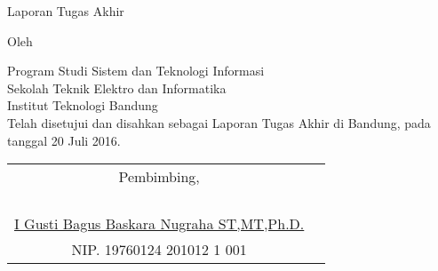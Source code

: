 \clearpage
\pagestyle{empty}

\begin{center}
\smallskip

    \Large \bfseries \MakeUppercase{\thetitle}
    \vfill

    \Large Laporan Tugas Akhir
    \vfill

    \large Oleh

    \Large \theauthor

    \large Program Studi Sistem dan Teknologi Informasi \\
    Sekolah Teknik Elektro dan Informatika \\
    Institut Teknologi Bandung \\

    \vfill
    \normalsize \normalfont
    Telah disetujui dan disahkan sebagai Laporan Tugas Akhir di Bandung, pada tanggal 20 Juli 2016.

    \vfill
    \setlength{\tabcolsep}{12pt}
    \begin{tabular}{c@{\hskip 0.5in}c}
        Pembimbing,\\
        \\
        \\
        \\
        \\
        \underline{I Gusti Bagus Baskara Nugraha ST,MT,Ph.D.}\\
        NIP. 19760124 201012 1 001\\
    \end{tabular}

\end{center}
\clearpage
